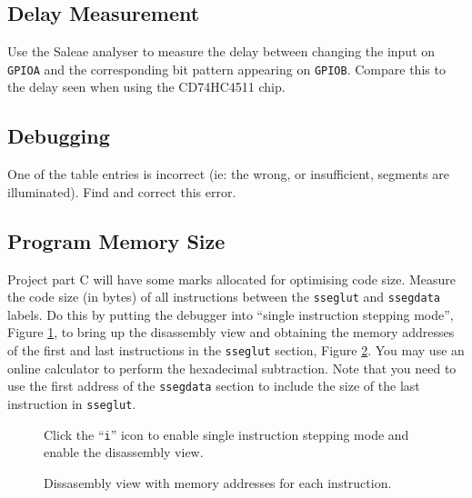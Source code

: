 \documentclass{UoNMCHA}
\numberwithin{equation}{section}
\begin{document}
\subsection{Delay Measurement}

Use the Saleae analyser to measure the delay between changing the input on \texttt{GPIOA} and the corresponding bit pattern appearing on \texttt{GPIOB}. Compare this to the delay seen when using the CD74HC4511 chip.


\subsection{Debugging}

One of the table entries is incorrect (ie: the wrong, or insufficient, segments are illuminated). Find and correct this error.

\subsection{Program Memory Size}

Project part C will have some marks allocated for optimising code size. Measure the code size (in bytes) of all instructions between the \texttt{sseglut} and \texttt{ssegdata} labels. Do this by putting the debugger into ``single instruction stepping mode'', Figure \ref{fig:step}, to bring up the disassembly view and obtaining the memory addresses of the first and last instructions in the \texttt{sseglut} section, Figure \ref{fig:size}. You may use an online calculator to perform the hexadecimal subtraction. Note that you need to use the first address of the \texttt{ssegdata} section to include the size of the last instruction in \texttt{sseglut}.

\begin{figure}[h]
\caption{Click the ``\texttt{i}'' icon to enable single instruction stepping mode and enable the disassembly view.}\label{fig:step}
\end{figure}

\begin{figure}[h]
\caption{Dissasembly view with memory addresses for each instruction.}\label{fig:size}
\end{figure}
\end{document}
